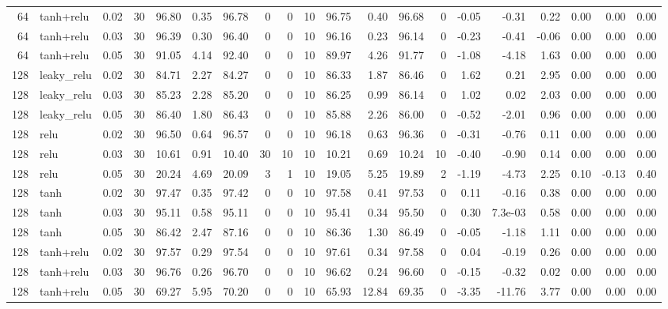 \begin{table}[htbp]
{\begin{tabular}{@{}rlrrrrrrrrrrrrrrrrrr@{}}
64 & tanh+relu & 0.02 & 30 & 96.80 & 0.35 & 96.78 & 0 & 0 & 10 & 96.75 & 0.40 & 96.68 & 0 & -0.05 & -0.31 & 0.22 & 0.00 & 0.00 & 0.00 \\
64 & tanh+relu & 0.03 & 30 & 96.39 & 0.30 & 96.40 & 0 & 0 & 10 & 96.16 & 0.23 & 96.14 & 0 & -0.23 & -0.41 & -0.06 & 0.00 & 0.00 & 0.00 \\
64 & tanh+relu & 0.05 & 30 & 91.05 & 4.14 & 92.40 & 0 & 0 & 10 & 89.97 & 4.26 & 91.77 & 0 & -1.08 & -4.18 & 1.63 & 0.00 & 0.00 & 0.00 \\
128 & leaky\_relu & 0.02 & 30 & 84.71 & 2.27 & 84.27 & 0 & 0 & 10 & 86.33 & 1.87 & 86.46 & 0 & 1.62 & 0.21 & 2.95 & 0.00 & 0.00 & 0.00 \\
128 & leaky\_relu & 0.03 & 30 & 85.23 & 2.28 & 85.20 & 0 & 0 & 10 & 86.25 & 0.99 & 86.14 & 0 & 1.02 & 0.02 & 2.03 & 0.00 & 0.00 & 0.00 \\
128 & leaky\_relu & 0.05 & 30 & 86.40 & 1.80 & 86.43 & 0 & 0 & 10 & 85.88 & 2.26 & 86.00 & 0 & -0.52 & -2.01 & 0.96 & 0.00 & 0.00 & 0.00 \\
128 & relu & 0.02 & 30 & 96.50 & 0.64 & 96.57 & 0 & 0 & 10 & 96.18 & 0.63 & 96.36 & 0 & -0.31 & -0.76 & 0.11 & 0.00 & 0.00 & 0.00 \\
128 & relu & 0.03 & 30 & 10.61 & 0.91 & 10.40 & 30 & 10 & 10 & 10.21 & 0.69 & 10.24 & 10 & -0.40 & -0.90 & 0.14 & 0.00 & 0.00 & 0.00 \\
128 & relu & 0.05 & 30 & 20.24 & 4.69 & 20.09 & 3 & 1 & 10 & 19.05 & 5.25 & 19.89 & 2 & -1.19 & -4.73 & 2.25 & 0.10 & -0.13 & 0.40 \\
128 & tanh & 0.02 & 30 & 97.47 & 0.35 & 97.42 & 0 & 0 & 10 & 97.58 & 0.41 & 97.53 & 0 & 0.11 & -0.16 & 0.38 & 0.00 & 0.00 & 0.00 \\
128 & tanh & 0.03 & 30 & 95.11 & 0.58 & 95.11 & 0 & 0 & 10 & 95.41 & 0.34 & 95.50 & 0 & 0.30 & 7.3e-03 & 0.58 & 0.00 & 0.00 & 0.00 \\
128 & tanh & 0.05 & 30 & 86.42 & 2.47 & 87.16 & 0 & 0 & 10 & 86.36 & 1.30 & 86.49 & 0 & -0.05 & -1.18 & 1.11 & 0.00 & 0.00 & 0.00 \\
128 & tanh+relu & 0.02 & 30 & 97.57 & 0.29 & 97.54 & 0 & 0 & 10 & 97.61 & 0.34 & 97.58 & 0 & 0.04 & -0.19 & 0.26 & 0.00 & 0.00 & 0.00 \\
128 & tanh+relu & 0.03 & 30 & 96.76 & 0.26 & 96.70 & 0 & 0 & 10 & 96.62 & 0.24 & 96.60 & 0 & -0.15 & -0.32 & 0.02 & 0.00 & 0.00 & 0.00 \\
128 & tanh+relu & 0.05 & 30 & 69.27 & 5.95 & 70.20 & 0 & 0 & 10 & 65.93 & 12.84 & 69.35 & 0 & -3.35 & -11.76 & 3.77 & 0.00 & 0.00 & 0.00 \\
\bottomrule
\end{tabular}}
\end{table}
